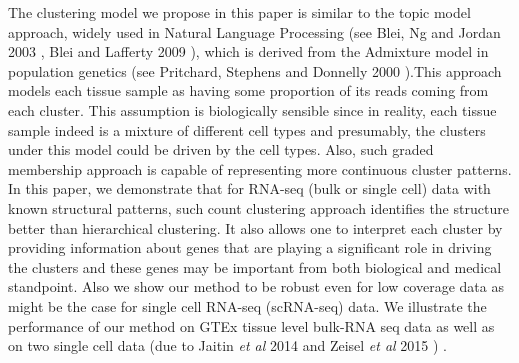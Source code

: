 The clustering model we propose in this paper is similar to the topic model approach, widely used in Natural Language Processing (see Blei, Ng and Jordan 2003 \cite{Blei2003}, Blei and Lafferty 2009 \cite{Blei2009}), which is derived from the Admixture model in population genetics (see Pritchard, Stephens and Donnelly 2000 \cite{Pritchard2000}).This approach models each tissue sample as having some proportion of its reads coming from each cluster. This assumption is biologically sensible since in reality, each tissue sample indeed is a mixture of different cell types and presumably, the clusters under this model could be driven by the cell types. Also, such graded membership approach is capable of representing more continuous cluster patterns. \\[1 pt]

In this paper, we demonstrate that for RNA-seq (bulk or single cell) data with known structural patterns, such count clustering approach identifies the structure better than hierarchical clustering. It also allows one to interpret each cluster by providing information about genes that are playing a significant role in driving the clusters and these genes may be important from both biological and medical standpoint. Also we show our method to be robust even for low coverage data as might be the case for single cell RNA-seq (scRNA-seq) data.
We illustrate the performance of our method on GTEx tissue level  bulk-RNA seq data as well as on two single cell data (due to Jaitin \textit{et al} 2014 \cite{Jaitin2014} and Zeisel \textit{et al} 2015 \cite{Zeisel2015}) . 


